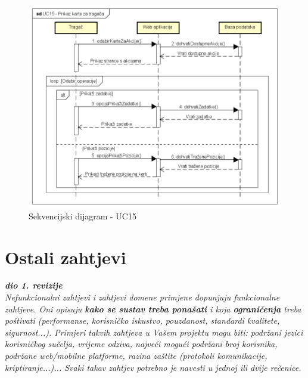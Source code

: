 				\begin{figure}[H]
					\includegraphics[scale=0.7]{slike/UC15_sekv.PNG} %
					\centering
					\caption{Sekvencijski dijagram - UC15}
					\label{fig:promjene}
				\end{figure}
	
		\section{Ostali zahtjevi}
		
			\textbf{\textit{dio 1. revizije}}\\
		 
			 \textit{Nefunkcionalni zahtjevi i zahtjevi domene primjene dopunjuju funkcionalne zahtjeve. Oni opisuju \textbf{kako se sustav treba ponašati} i koja \textbf{ograničenja} treba poštivati (performanse, korisničko iskustvo, pouzdanost, standardi kvalitete, sigurnost...). Primjeri takvih zahtjeva u Vašem projektu mogu biti: podržani jezici korisničkog sučelja, vrijeme odziva, najveći mogući podržani broj korisnika, podržane web/mobilne platforme, razina zaštite (protokoli komunikacije, kriptiranje...)... Svaki takav zahtjev potrebno je navesti u jednoj ili dvije rečenice.}
			 
